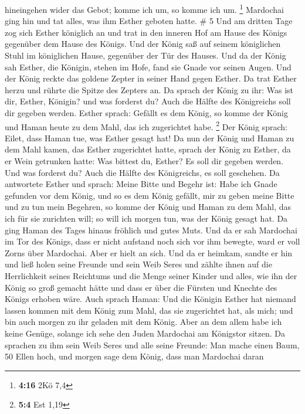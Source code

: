 hineingehen wider das Gebot; komme ich um, so komme ich um. \footnote{\textbf{4:16}
  2Kö 7,4}  Mardochai ging hin und tat alles, was ihm
Esther geboten hatte. \# 5  Und am dritten Tage zog sich
Esther königlich an und trat in den inneren Hof am Hause des Königs
gegenüber dem Hause des Königs. Und der König saß auf seinem königlichen
Stuhl im königlichen Hause, gegenüber der Tür des Hauses. 
Und da der König sah Esther, die Königin, stehen im Hofe, fand sie Gnade
vor seinen Augen. Und der König reckte das goldene Zepter in seiner Hand
gegen Esther. Da trat Esther herzu und rührte die Spitze des Zepters an.
 Da sprach der König zu ihr: Was ist dir, Esther, Königin?
und was forderst du? Auch die Hälfte des Königreichs soll dir gegeben
werden.  Esther sprach: Gefällt es dem König, so komme der
König und Haman heute zu dem Mahl, das ich zugerichtet habe. \footnote{\textbf{5:4}
  Est 1,19}  Der König sprach: Eilet, dass Haman tue, was
Esther gesagt hat! Da nun der König und Haman zu dem Mahl kamen, das
Esther zugerichtet hatte,  sprach der König zu Esther, da er
Wein getrunken hatte: Was bittest du, Esther? Es soll dir gegeben
werden. Und was forderst du? Auch die Hälfte des Königreichs, es soll
geschehen.  Da antwortete Esther und sprach: Meine Bitte und
Begehr ist:  Habe ich Gnade gefunden vor dem König, und so
es dem König gefällt, mir zu geben meine Bitte und zu tun mein Begehren,
so komme der König und Haman zu dem Mahl, das ich für sie zurichten
will; so will ich morgen tun, was der König gesagt hat.  Da
ging Haman des Tages hinaus fröhlich und gutes Muts. Und da er sah
Mardochai im Tor des Königs, dass er nicht aufstand noch sich vor ihm
bewegte, ward er voll Zorns über Mardochai.  Aber er hielt
an sich. Und da er heimkam, sandte er hin und ließ holen seine Freunde
und sein Weib Seres  und zählte ihnen auf die Herrlichkeit
seines Reichtums und die Menge seiner Kinder und alles, wie ihn der
König so groß gemacht hätte und dass er über die Fürsten und Knechte des
Königs erhoben wäre.  Auch sprach Haman: Und die Königin
Esther hat niemand lassen kommen mit dem König zum Mahl, das sie
zugerichtet hat, als mich; und bin auch morgen zu ihr geladen mit dem
König.  Aber an dem allem habe ich keine Genüge, solange
ich sehe den Juden Mardochai am Königstor sitzen.  Da
sprachen zu ihm sein Weib Seres und alle seine Freunde: Man mache einen
Baum, 50 Ellen hoch, und morgen sage dem König, dass man Mardochai daran

